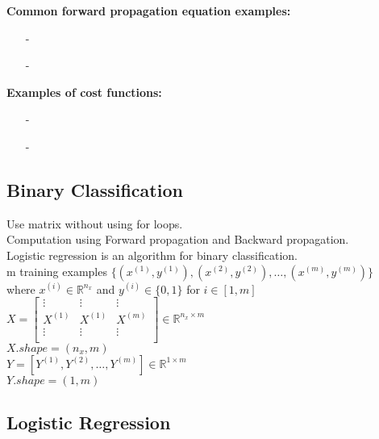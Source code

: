 \documentclass{article}
\begin{document}
    \textbf{Common forward propagation equation examples:}
    \begin{itemize}
        \item[-]{}
        \item[-]{}
    \end{itemize}

    \textbf{Examples of cost functions:}
    \begin{itemize}
        \item[-]{}
        \item[-]{}
    \end{itemize}

\newpage
\subsection{Binary Classification}

    Use matrix without using for loops.\\
    Computation using Forward propagation and Backward propagation.\\
    Logistic regression is an algorithm for binary classification.\\

    m training examples
    $\{(x^{(1)}, y^{(1)}), (x^{(2)}, y^{(2)}), \hdots, (x^{(m)}, y^{(m)})\}$ \\
    where $x^{(i)} \in \mathbb{R}^{n_x}$ and $y^{(i)} \in \{0,1\}$ for $i \in [1,m]$ \\

    $X =
    \begin{bmatrix}
        \vdots & \vdots & \vdots \\
        X^{(1)} & X^{(1)} & X^{(m)} \\
        \vdots & \vdots & \vdots \\
    \end{bmatrix}
    \in \mathbb{R}^{n_x \times m}
    $\\

    $X.shape = (n_x, m)$\\

    $Y = [Y^{(1)}, Y^{(2)}, \hdots, Y^{(m)}]
    \in \mathbb{R}^{1 \times m}
    $\\

    $Y.shape = (1, m)$\\

\newpage
\subsection{Logistic Regression}
\end{document}
